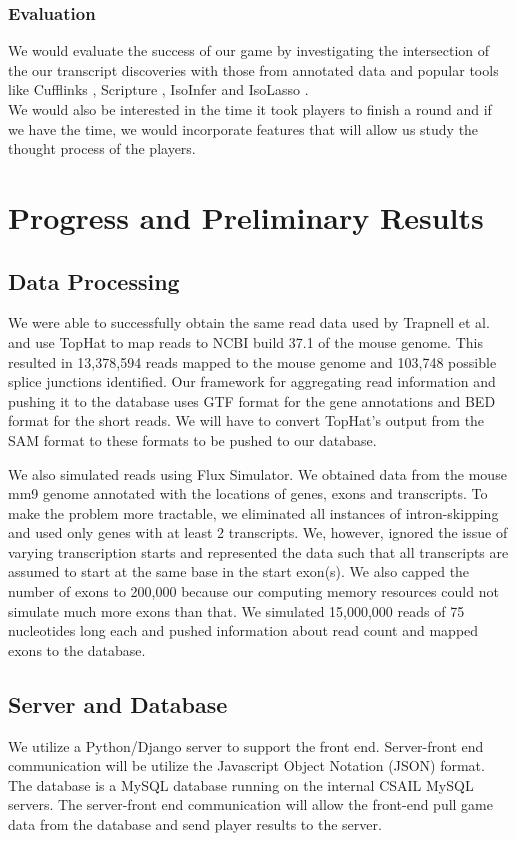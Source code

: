 \documentclass[12pt]{article}
\begin{document}
\subsubsection*{Evaluation}
We would evaluate the success of our game by investigating the intersection of the our transcript discoveries with those from annotated data and popular tools like Cufflinks \citep{trapnell2010transcript}, Scripture \citep{guttman2010ab} , IsoInfer \citep{feng2010inference} and IsoLasso \citep{li2011isolasso}. \\
We would also be interested in the time it took players to finish a round and if we have the time, we would incorporate features that will allow us study the thought process of the players.

\section*{Progress and Preliminary Results}

\subsection*{Data Processing}
We were able to successfully obtain the same read data used by Trapnell et al. \citep{trapnell2010transcript} and use TopHat to map reads to NCBI build 37.1 of the mouse genome.
This resulted in 13,378,594 reads mapped to the mouse genome and 103,748 possible splice junctions identified. Our framework for aggregating read information and pushing it to the database uses GTF format for the gene annotations and BED format for the short reads. We will have to convert TopHat's output from the SAM format to these formats to be pushed to our database.

We also simulated reads using Flux Simulator. We obtained data from the mouse mm9 genome annotated with the locations of genes, exons and transcripts. To make the problem more tractable, we eliminated all instances of intron-skipping and used only genes with at least 2 transcripts. We, however, ignored the issue of varying transcription starts and represented the data such that all transcripts are assumed to start at the same base in the start exon(s). We also capped the number of exons to 200,000 because our computing memory resources could not simulate much more exons than that. We simulated 15,000,000 reads of 75 nucleotides long each and pushed information about read count and mapped exons to the database.

\subsection*{Server and Database}
We utilize a Python/Django server to support the front end. Server-front end communication will be utilize the Javascript Object Notation (JSON) format. The database is a MySQL database running on the internal CSAIL MySQL servers. The server-front end communication will allow the front-end pull game data from the database and send player results to the server.
\end{document}
